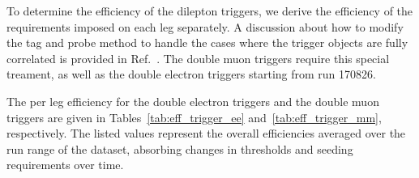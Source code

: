  
To determine the efficiency of the dilepton triggers, we derive the efficiency of the 
requirements imposed on each leg separately. A discussion about how to modify the
tag and probe method to handle the cases where the trigger objects are fully correlated
is provided in Ref.~\cite{HWW2011AN}. The double muon triggers require this special treament, as 
well as the double electron triggers starting from run 170826.

The per leg efficiency for the double electron triggers and the double muon triggers are given in 
Tables~\ref{tab:eff_trigger_ee} and~\ref{tab:eff_trigger_mm}, 
respectively. The listed values represent the overall efficiencies averaged over the run range
of the dataset, absorbing changes in thresholds and seeding requirements over time.
\vspace{10pt}

